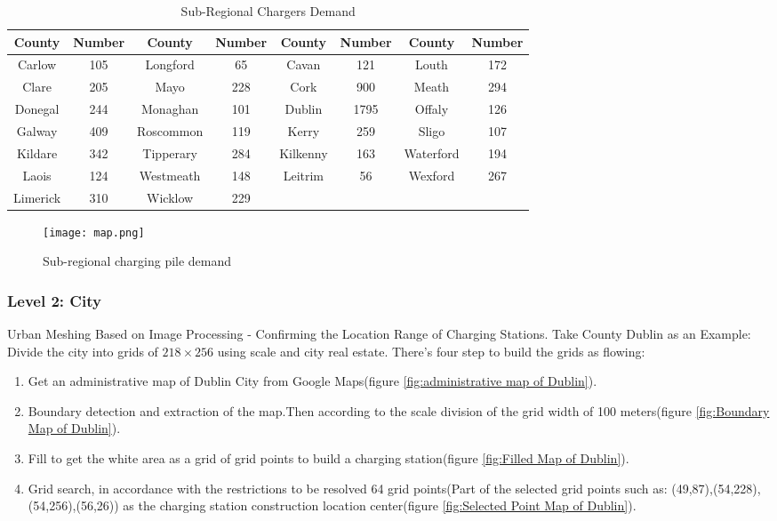\documentclass{mcmthesis}
\begin{document}
\begin{table}[h]
\centering
\caption{Sub-Regional Chargers Demand}\label{tab:Sub-regional charging pile demand Ireland}
\begin{tabular}{cc|cc|cc|cc}
\toprule
  County & Number &  County & Number & County & Number &  County & Number \\
\midrule
Carlow	&105	&Longford	&65 &Cavan	&121	&Louth	&172\\
Clare	&205	&Mayo	&228 & Cork	&900	&Meath	&294\\
Donegal	&244	&Monaghan	&101 & Dublin	&1795	&Offaly	&126\\
Galway	&409	&Roscommon	&119 & Kerry	&259	&Sligo	&107\\
Kildare	&342	&Tipperary	&284 & Kilkenny	&163	&Waterford	&194\\
Laois	&124	&Westmeath	&148 & Leitrim	& 56	& Wexford 	&267\\
Limerick	&310	&Wicklow	&229\\
\bottomrule
\end{tabular}
\end{table}

\begin{figure}[!h]
\small
\centering
\texttt{[image: map.png]}
\caption{Sub-regional charging pile demand} \label{fig:Sub-regional charging pile demand}
\end{figure}

\newpage
\subsubsection*{Level 2: City}

\par Urban Meshing Based on Image Processing - Confirming the Location Range of Charging Stations. Take County Dublin as an Example: Divide the city into grids of $ 218 \times 256 $ using scale and city real estate. There's four step to build the grids as flowing:

\begin{enumerate}
	\item Get an administrative map of Dublin City from Google Maps(figure \ref{fig:administrative map of Dublin}).
	\item Boundary detection and extraction of the map.Then according to the scale division of the grid width of 100 meters(figure \ref{fig:Boundary Map of Dublin}).
	\item Fill to get the white area as a grid of grid points to build a charging station(figure \ref{fig:Filled Map of Dublin}).
	\item Grid search, in accordance with the restrictions to be resolved 64 grid points(Part of the selected grid points such as: (49,87),(54,228),(54,256),(56,26)) as the charging station construction location center(figure \ref{fig:Selected Point Map of Dublin}).
\end{enumerate}
\end{document}
